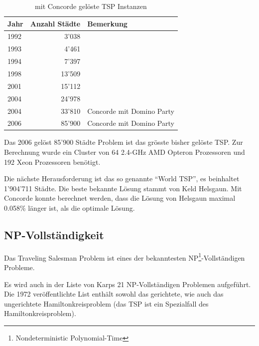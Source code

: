 \documentclass[11pt,a4paper]{article}
\begin{document}
        \begin{table}[H]
                \centering
                \begin{tabular}{| l | r | l |}
                    \hline
                        Jahr    & Anzahl Städte & Bemerkung                 \\ \hline
                        1992    & 3'038         &                           \\ \hline
                        1993    & 4'461         &                           \\ \hline
                        1994    & 7'397         &                           \\ \hline
                        1998    & 13'509        &                           \\ \hline
                        2001    & 15'112        &                           \\ \hline
                        2004    & 24'978        &                           \\ \hline
                        2004    & 33'810        & Concorde mit Domino Party \\ \hline
                        2006    & 85'900        & Concorde mit Domino Party \\ \hline
                \end{tabular}
                \caption{mit Concorde gelöste TSP Instanzen}
                \label{tab:concorde_history}
        \end{table}

Das 2006 gelöst 85'900 Städte Problem ist das grösste bisher gelöste TSP. Zur Berechnung wurde ein Cluster von 64 2.4-GHz AMD Opteron Prozessoren und 192 Xeon Prozessoren benötigt.

Die nächste Herausforderung ist das so genannte "`World TSP"', es beinhaltet 1'904'711 Städte. Die beste bekannte Lösung stammt von Keld Helsgaun. Mit Concorde konnte berechnet werden, dass die Lösung von Helsgaun maximal 0.058\% länger ist, als die optimale Lösung.

\newpage

\subsection{NP-Vollständigkeit}
Das Traveling Salesman Problem ist eines der bekanntesten NP\footnote{Nondeterministic Polynomial-Time}-Vollständigen Probleme. 

Es wird auch in der Liste von Karps 21 NP-Vollständigen Problemen aufgeführt. Die 1972 veröffentlichte List\cite{karp72} enthält sowohl das gerichtete, wie auch das ungerichtete Hamiltonkreisproblem (das TSP ist ein Spezialfall des Hamiltonkreisproblem). 
\end{document}
